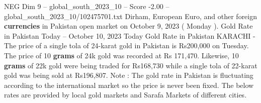\begin{textsample}{NEG Dim 9 – global\_south\_2023\_10 – Score -2.00 – global\_south\_2023\_10/102475701.txt}
Dirham, European Euro, and other foreign \textbf{currencies} in Pakistan open market on October 9, 2023 ( Monday ).
Gold Rate in Pakistan Today -- October 10, 2023 Today Gold Rate in Pakistan KARACHI - The price of a single tola of 24-karat gold in Pakistan is Rs200,000 on Tuesday.
The price of 10 \textbf{grams} of 24k gold was recorded at Rs 171,470.
Likewise, 10 \textbf{grams} of 22k gold were being traded for Rs168,730 while a single tola of 22-karat gold was being sold at Rs196,807.
Note : The gold rate in Pakistan is fluctuating according to the international market so the price is never been fixed.
The below rates are provided by local gold markets and Sarafa Markets of different cities.

\end{textsample}
